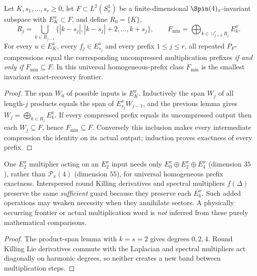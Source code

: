 \documentclass[12pt,a4paper]{article}
\begin{document}
\begin{theorem}
\label{p2c:thm:v270-homogeneous-prefix-guard}
Let $K,s_1,\ldots,s_r\ge0$, let $F\subset L^2(S^3_x)$ be a
finite-dimensional $\Spin(4)_x$-invariant subspace with $E_K^x\subset F$,
and define $R_0=\{K\}$,
\[
R_j=\bigcup_{k\in R_{j-1}}
 \{|k-s_j|,|k-s_j|+2,\ldots,k+s_j\},\qquad
F_{\min}=\bigoplus_{k\in\cup_{j=0}^{r}R_j}E_k^x.
\]
For every $u\in E_K^x$, every $f_j\in E_{s_j}^x$ and every prefix
$1\le j\le r$, all repeated $P_F$-compressions equal the corresponding
uncompressed multiplication prefixes \emph{if and only if}
$F_{\min}\subseteq F$.  In this universal homogeneous-prefix class
$F_{\min}$ is the smallest invariant exact-recovery frontier.
\end{theorem}
\begin{proof}
The span $W_0$ of possible inputs is $E_K^x$.  Inductively the span
$W_j$ of all length-$j$ products equals the span of
$E_{s_j}^xW_{j-1}$, and the previous lemma gives
$W_j=\bigoplus_{k\in R_j}E_k^x$. If every compressed prefix equals
its uncompressed output then each $W_j\subseteq F$, hence
$F_{\min}\subseteq F$. Conversely this inclusion makes every
intermediate compression the identity on its actual output; induction
proves exactness of every prefix.
\end{proof}
\begin{corollary}
\label{p2c:cor:v270-homogeneous-sparse-recovery}
One $E_2^x$ multiplier acting on an $E_2^x$ input needs only
$E_0^x\oplus E_2^x\oplus E_4^x$ (dimension $35$), rather than
$\mathcal P_x(4)$ (dimension $55$), for universal homogeneous
prefix exactness. Interspersed round Killing derivatives and
spectral multipliers $f(\Delta)$ preserve the same \emph{sufficient}
guard because they preserve each $E_k^x$. Such added operations may
weaken necessity when they annihilate sectors.  A physically occurring
frontier or actual multiplication word is \emph{not} inferred from
these purely mathematical comparisons.
\end{corollary}
\begin{proof}
The product-span lemma with $k=s=2$ gives degrees $0,2,4$.
Round Killing Lie derivatives commute with the Laplacian and
spectral multipliers act diagonally on harmonic degrees, so neither
creates a new band between multiplication steps.
\end{proof}
\end{document}
